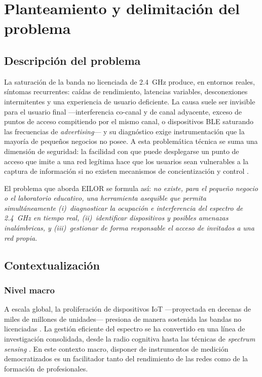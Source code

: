 \chapter{Planteamiento y delimitación del problema}
\label{cap:problema}

\section{Descripción del problema}
La saturación de la banda no licenciada de 2.4~GHz produce, en entornos reales, síntomas recurrentes: caídas de rendimiento, latencias variables, desconexiones intermitentes y una experiencia de usuario deficiente. La causa suele ser invisible para el usuario final ---interferencia co\nobreakdash-canal y de canal adyacente, exceso de puntos de acceso compitiendo por el mismo canal, o dispositivos BLE saturando las frecuencias de \emph{advertising}--- y su diagnóstico exige instrumentación que la mayoría de pequeños negocios no posee. A esta problemática técnica se suma una dimensión de seguridad: la facilidad con que puede desplegarse un punto de acceso que imite a una red legítima hace que los usuarios sean vulnerables a la captura de información si no existen mecanismos de concientización y control \parencite{owasp2021,callegati2009}.

El problema que aborda EILOR se formula así: \emph{no existe, para el pequeño negocio o el laboratorio educativo, una herramienta asequible que permita simultáneamente (i)~diagnosticar la ocupación e interferencia del espectro de 2.4~GHz en tiempo real, (ii)~identificar dispositivos y posibles amenazas inalámbricas, y (iii)~gestionar de forma responsable el acceso de invitados a una red propia}.

\section{Contextualización}

\subsection{Nivel macro}
A escala global, la proliferación de dispositivos IoT ---proyectada en decenas de miles de millones de unidades--- presiona de manera sostenida las bandas no licenciadas \parencite{akyildiz2006}. La gestión eficiente del espectro se ha convertido en una línea de investigación consolidada, desde la radio cognitiva hasta las técnicas de \emph{spectrum sensing} \parencite{yucek2009}. En este contexto macro, disponer de instrumentos de medición democratizados es un facilitador tanto del rendimiento de las redes como de la formación de profesionales.

